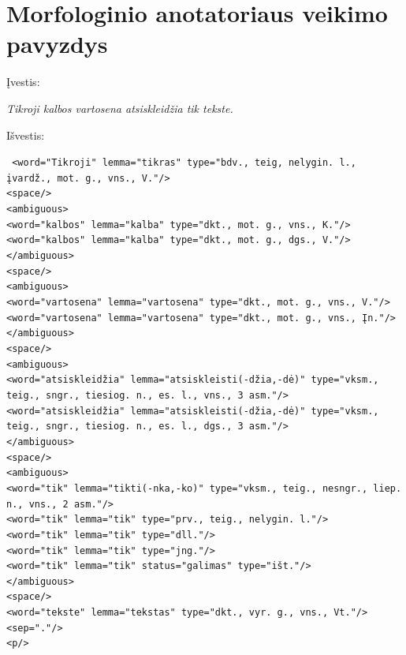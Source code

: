 \documentclass{VUMIFInfBakalaurinis}
\begin{document}
\appendix  %

\section{Morfologinio anotatoriaus veikimo pavyzdys}\label{morfAnot}

\noindent Įvestis:

\noindent \textit{Tikroji kalbos vartosena atsiskleidžia tik tekste.}

\noindent Išvestis:

\scriptsize
\noindent \texttt{
<word="Tikroji" lemma="tikras" type="bdv., teig, nelygin. l., įvardž., mot. g., vns., V."/>\\
<space/>\\
<ambiguous>\\
<word="kalbos" lemma="kalba" type="dkt., mot. g., vns., K."/>\\
<word="kalbos" lemma="kalba" type="dkt., mot. g., dgs., V."/>\\
</ambiguous>\\
<space/>\\
<ambiguous>\\
<word="vartosena" lemma="vartosena" type="dkt., mot. g., vns., V."/>\\
<word="vartosena" lemma="vartosena" type="dkt., mot. g., vns., Įn."/>\\
</ambiguous>\\
<space/>\\
<ambiguous>\\
<word="atsiskleidžia" lemma="atsiskleisti(-džia,-dė)" type="vksm., teig., sngr., tiesiog. n., es. l., vns., 3 asm."/>\\
<word="atsiskleidžia" lemma="atsiskleisti(-džia,-dė)" type="vksm., teig., sngr., tiesiog. n., es. l., dgs., 3 asm."/>\\
</ambiguous>\\
<space/>\\
<ambiguous>\\
<word="tik" lemma="tikti(-nka,-ko)" type="vksm., teig., nesngr., liep. n., vns., 2 asm."/>\\
<word="tik" lemma="tik" type="prv., teig., nelygin. l."/>\\
<word="tik" lemma="tik" type="dll."/>\\
<word="tik" lemma="tik" type="jng."/>\\
<word="tik" lemma="tik" status="galimas" type="išt."/>\\
</ambiguous>\\
<space/>\\
<word="tekste" lemma="tekstas" type="dkt., vyr. g., vns., Vt."/>\\
<sep="."/>\\
<p/>
}
\normalsize
\end{document}
